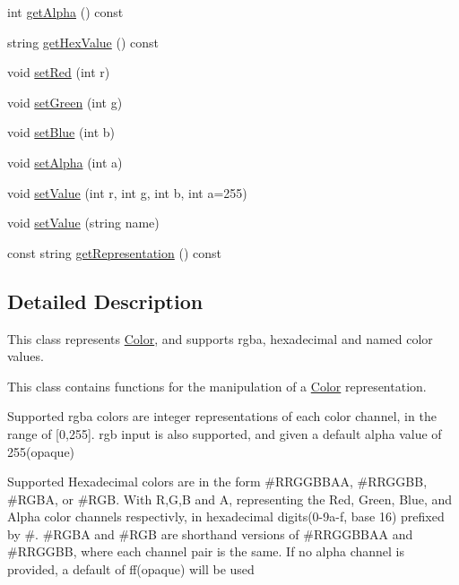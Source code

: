 \begin{DoxyCompactItemize}
int \mbox{\hyperlink{classbridges_1_1_color_a61523716f5597013d57bc98eae1fe96a}{get\+Alpha}} () const
\item 
string \mbox{\hyperlink{classbridges_1_1_color_a051fa9e828ce7025093c65c46358a8cf}{get\+Hex\+Value}} () const
\item 
void \mbox{\hyperlink{classbridges_1_1_color_a6d7521acce040aca88645f6ad1bf5f44}{set\+Red}} (int r)
\item 
void \mbox{\hyperlink{classbridges_1_1_color_a7689ebb07ae20ad846827e4f42546ba8}{set\+Green}} (int g)
\item 
void \mbox{\hyperlink{classbridges_1_1_color_a3b0e703dd68d7e695664264908e0f709}{set\+Blue}} (int b)
\item 
void \mbox{\hyperlink{classbridges_1_1_color_ab139e842be237a8963d46c6a3edb488d}{set\+Alpha}} (int a)
\item 
void \mbox{\hyperlink{classbridges_1_1_color_a3d6c66d33bd8a702a4436925c9cbd1fd}{set\+Value}} (int r, int g, int b, int a=255)
\item 
void \mbox{\hyperlink{classbridges_1_1_color_aa6e1db9aa47275ef829ac0fa96d72190}{set\+Value}} (string name)
\item 
const string \mbox{\hyperlink{classbridges_1_1_color_a7febf2d083d306060a5017d06abd6ec0}{get\+Representation}} () const
\end{DoxyCompactItemize}


\subsection{Detailed Description}
This class represents \mbox{\hyperlink{classbridges_1_1_color}{Color}}, and supports rgba, hexadecimal and named color values. 

This class contains functions for the manipulation of a \mbox{\hyperlink{classbridges_1_1_color}{Color}} representation.

Supported rgba colors are integer representations of each color channel, in the range of \mbox{[}0,255\mbox{]}. rgb input is also supported, and given a default alpha value of 255(opaque)

Supported Hexadecimal colors are in the form \#\+R\+R\+G\+G\+B\+B\+AA, \#\+R\+R\+G\+G\+BB, \#\+R\+G\+BA, or \#\+R\+GB. With R,G,B and A, representing the Red, Green, Blue, and Alpha color channels respectivly, in hexadecimal digits(0-\/9a-\/f, base 16) prefixed by \textquotesingle{}\#\textquotesingle{}. \#\+R\+G\+BA and \#\+R\+GB are shorthand versions of \#\+R\+R\+G\+G\+B\+B\+AA and \#\+R\+R\+G\+G\+BB, where each channel pair is the same. If no alpha channel is provided, a default of \textquotesingle{}ff\textquotesingle{}(opaque) will be used

